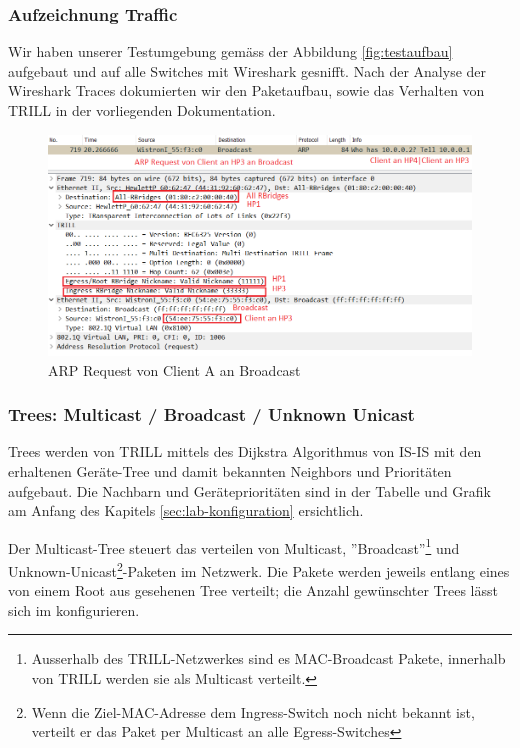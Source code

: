 \clearpage


\subsubsection{Aufzeichnung Traffic}
Wir haben unserer Testumgebung gemäss der Abbildung \ref{fig:testaufbau} aufgebaut und auf alle Switches mit Wireshark gesnifft. Nach der Analyse der Wireshark Traces dokumierten wir den Paketaufbau, sowie das Verhalten von TRILL in der vorliegenden Dokumentation. 
\begin{figure}
	\centering
	\includegraphics[width=\linewidth]{images/trill_package}
	\caption{ARP Request von Client A an Broadcast}
	\label{fig:trillpackage}
\end{figure}

\subsubsection{Trees: Multicast / Broadcast / Unknown Unicast}\label{sec:trees-multicast--broadcast--unknown-unicast}

Trees werden von TRILL mittels des Dijkstra Algorithmus von IS-IS mit den erhaltenen Geräte-Tree und damit bekannten Neighbors und Prioritäten aufgebaut. Die Nachbarn und Geräteprioritäten sind in der Tabelle und Grafik am Anfang des Kapitels \ref{sec:lab-konfiguration} ersichtlich.

Der Multicast-Tree steuert das verteilen von Multicast, ''Broadcast''\footnote{Ausserhalb des TRILL-Netzwerkes sind es MAC-Broadcast Pakete, innerhalb von TRILL werden sie als Multicast verteilt.} und Unknown-Unicast\footnote{Wenn die Ziel-MAC-Adresse dem Ingress-Switch noch nicht bekannt ist, verteilt er das Paket per Multicast an alle Egress-Switches}-Paketen im Netzwerk. Die Pakete werden jeweils entlang eines von einem Root aus gesehenen Tree verteilt; die Anzahl gewünschter Trees lässt sich im konfigurieren.

